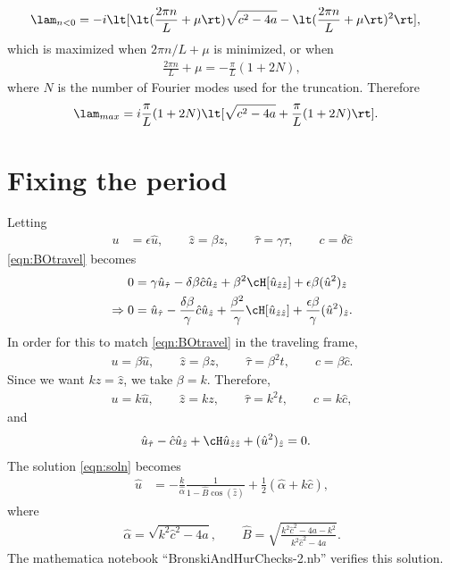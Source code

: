 \documentclass[a4paper,10pt]{article}
\begin{document}
\begin{align}
  \lam_{n<0} &= -i \lt[\lt(\frac{2\pi n}{L}+\mu\rt)\sqrt{c^2-4a} -
  \lt(\frac{2\pi n}L + \mu\rt)^2\rt],
\end{align}
which is maximized when $2\pi n/L+\mu$ is minimized, or when 
\begin{align}
  \frac{2\pi n}{L}+\mu = -\frac{\pi}{L}(1+2N),
\end{align}
where $N$ is the number of Fourier modes used for the truncation. Therefore
\begin{align}
  \lam_{max} &=  i \frac{\pi}{L}(1+2N)\lt[ \sqrt{c^2-4a} + \frac\pi
  L(1+2N)\rt].
\end{align}








\section{Fixing the period}
Letting 
\begin{align}
  u &= \epsilon \hat u, \qquad \hat z = \beta z, \qquad \hat \tau = \gamma \tau, \qquad
  c = \delta \hat c
\end{align}
\eqref{eqn:BOtravel} becomes
\begin{align}
  0 &= \gamma \hat u_{\hat \tau} - \delta \beta \hat c \hat u_{\hat z}+ \beta^2
  \cH [\hat u_{\hat z \hat z}] + \epsilon \beta (\hat u^2)_{\hat z}\\
  \Rightarrow 0 &= \hat u_{\hat \tau} - \frac{\delta \beta}\gamma \hat c \hat
  u_{\hat z} + \frac{\beta^2}{\gamma} \cH [\hat u_{\hat z \hat z}] +
  \frac{\epsilon \beta}{\gamma} (\hat u^2)_{\hat z}.
\end{align}
In order for this to match \eqref{eqn:BOtravel} in the traveling frame,
\begin{align}
  u = \beta \hat u, \qquad \hat z = \beta z,\qquad  \hat \tau = \beta^2 t,\qquad  c = \beta \hat c.
\end{align}
Since we want $kz = \hat z$, we take $\beta = k$. Therefore,
\begin{align}
  u = k \hat u,\qquad  \hat z = k z, \qquad \hat \tau = k^2 t, \qquad c = k \hat c,
\end{align}
and
\begin{align}
  \hat u_{\hat \tau} - \hat c \hat u_{\hat z} + \cH \hat u_{\hat z \hat z} +
  (\hat u^2)_{\hat z} &=0.\label{eqn:BOtravelScaleFree}
\end{align}
The solution \eqref{eqn:soln} becomes
\begin{align}
  \hat u &= -\frac{k}{\hat \alpha} \frac{1}{1 - \hat B \cos(\hat z)} + \frac12(\hat
  \alpha + k \hat c),
\end{align}
where
\begin{align}
  \hat \alpha = \sqrt{ k^2 \hat c^2 - 4a}, \qquad \hat B = \sqrt{\frac{ k^2 \hat
  c^2 -4a - k^2}{k^2 \hat c^2 -4a}}.
\end{align}
The mathematica notebook ``BronskiAndHurChecks-2.nb'' verifies this solution.


{\footnotesize

}
\end{document}

